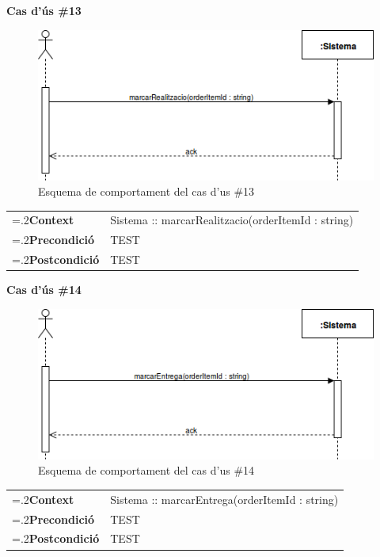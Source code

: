 \clearpage
\noindent\textbf{\large Cas d'ús \#13}\\
\begin{figure}[H]
\centering
\includegraphics[scale=0.6]{Figures/casdus_13.png}
\caption{Esquema de comportament del cas d'us \#13}
\end{figure}
\begin{table}[h]
\noindent
\begin{tabularx}{\linewidth}{
>{\hsize=.2\hsize}X%
>{\hsize=0.8\hsize}X%
}
\textbf{Context} 		& Sistema :: marcarRealitzacio(orderItemId : string) \\
\textbf{Precondició} 	& TEST \\
\textbf{Postcondició}	& TEST \\
\end{tabularx}
\label{}
\end{table}

\noindent\textbf{\large Cas d'ús \#14}\\
\begin{figure}[H]
\centering
\includegraphics[scale=0.6]{Figures/casdus_14.png}
\caption{Esquema de comportament del cas d'us \#14}
\end{figure}
\begin{table}[h]
\noindent
\begin{tabularx}{\linewidth}{
>{\hsize=.2\hsize}X%
>{\hsize=0.8\hsize}X%
}
\textbf{Context} 		& Sistema :: marcarEntrega(orderItemId : string) \\
\textbf{Precondició} 	& TEST \\
\textbf{Postcondició}	& TEST \\
\end{tabularx}
\label{}
\end{table}

